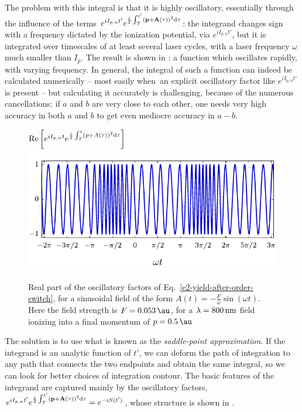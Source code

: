 The problem with this integral is that it is highly oscillatory, essentially through the influence of the terms $e^{i I_{p,n} t'} e^{\frac{i}{2} \int_T^{t'} \left(\vb{p}+ \vb{A}(\tau) \right)^2\mathrm{d}\tau}$: the integrand changes sign with a frequency dictated by the ionization potential, via $e^{i I_{p,n} t'}$, but it is integrated over timescales of at least several laser cycles, with a laser frequency $\omega$ much smaller than $I_p$. The result is shown in : a function which oscillates rapidly, with varying frequency. In general, the integral of such a function can indeed be calculated numerically -- most easily when\ an explicit oscillatory factor like $e^{i I_{p,n} t'}$ is present -- but calculating it accurately is challenging, because of the numerous cancellations: if $a$ and $b$ are very close to each other, one needs very high accuracy in both $a$ and $b$ to get even mediocre accuracy in $a-b$.



\begin{figure}[htb]
  \centering
  $\Re\left[
  e^{i I_{p,n} t}e^{\frac{i}{2} \int_T^{t}\left(p+A(\tau)\right)^2\mathrm{d}\tau}
  \right]$\\[-3mm]
  \includegraphics[scale=1]{2-ARM-theory/Figures/figure2A.pdf}
  \caption[Oscillatory factors of the SFA integrand prior to the saddle-point approximation]{%
  Real part of the oscillatory factors of Eq.~\eqref{e2-yield-after-order-switch}, for a sinusoidal field of the form $A(t)=-\frac{F}{\omega}\sin(\omega t)$.
  Here the field strength is $F=\SI{\figuretwoAfield}{\au}$, for a $\lambda= \SI{800}{nm}$ field ionizing \figuretwoAtarget{} into a final momentum of $p=\SI{\figuretwoAmomentum}{\au}$
  }
  \label{f2-oscillatory-factors}
\end{figure}


The solution is to use what is known as the \textit{saddle-point approximation}. If the integrand is an analytic function of $t'$, we can deform the path of integration to any path that connects the two endpoints and obtain the same integral, so we can look for better choices of integration contour. The basic features of the integrand are captured mainly by the oscillatory factors, $e^{i I_{p,n} t'} e^{\frac{i}{2} \int_T^{t'} \left(\vb{p}+ \vb{A}(\tau) \right)^2\mathrm{d}\tau}=e^{-iS(t')}$, whose structure is shown in . 

